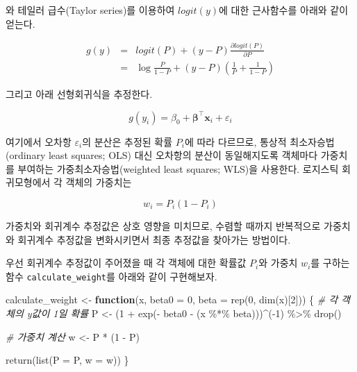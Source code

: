 \documentclass[
]{book}
\newenvironment{Shaded}{\begin{snugshade}}{\end{snugshade}}
\newcommand{\AttributeTok}[1]{\textcolor[rgb]{0.77,0.63,0.00}{#1}}
\newcommand{\CommentTok}[1]{\textcolor[rgb]{0.56,0.35,0.01}{\textit{#1}}}
\newcommand{\ControlFlowTok}[1]{\textcolor[rgb]{0.13,0.29,0.53}{\textbf{#1}}}
\newcommand{\DecValTok}[1]{\textcolor[rgb]{0.00,0.00,0.81}{#1}}
\newcommand{\FunctionTok}[1]{\textcolor[rgb]{0.00,0.00,0.00}{#1}}
\newcommand{\NormalTok}[1]{#1}
\newcommand{\OtherTok}[1]{\textcolor[rgb]{0.56,0.35,0.01}{#1}}
\newcommand{\SpecialCharTok}[1]{\textcolor[rgb]{0.00,0.00,0.00}{#1}}
\begin{document}
와 테일러 급수(Taylor series)를 이용하여 \(logit(y)\)에 대한 근사함수를 아래와 같이 얻는다.

\begin{eqnarray*}
g(y) &=& logit(P) + (y - P) \frac{\partial logit(P)}{\partial P}\\
&=& \log \frac{P}{1 - P} + (y - P) \left( \frac{1}{P} + \frac{1}{1 - P} \right)
\end{eqnarray*}

그리고 아래 선형회귀식을 추정한다.

\begin{equation*}
g(y_i) = \beta_0 + \boldsymbol\beta^\top \mathbf{x}_i + \varepsilon_i
\end{equation*}

여기에서 오차항 \(\varepsilon_i\)의 분산은 추정된 확률 \(P_i\)에 따라 다르므로, 통상적 최소자승법(ordinary least squares; OLS) 대신 오차항의 분산이 동일해지도록 객체마다 가중치를 부여하는 가중최소자승법(weighted least squares; WLS)을 사용한다. 로지스틱 회귀모형에서 각 객체의 가중치는

\begin{equation*}
w_i = P_i (1 - P_i)
\end{equation*}

가중치와 회귀계수 추정값은 상호 영향을 미치므로, 수렴할 때까지 반복적으로 가중치와 회귀계수 추정값을 변화시키면서 최종 추정값을 찾아가는 방법이다.

우선 회귀계수 추정값이 주어졌을 때 각 객체에 대한 확률값 \(P_i\)와 가중치 \(w_i\)를 구하는 함수 \texttt{calculate\_weight}를 아래와 같이 구현해보자.

\begin{Shaded}
\begin{Highlighting}[]
\NormalTok{calculate\_weight }\OtherTok{\textless{}{-}} \ControlFlowTok{function}\NormalTok{(x, }\AttributeTok{beta0 =} \DecValTok{0}\NormalTok{, }
                             \AttributeTok{beta =} \FunctionTok{rep}\NormalTok{(}\DecValTok{0}\NormalTok{, }\FunctionTok{dim}\NormalTok{(x)[}\DecValTok{2}\NormalTok{])) \{}
  \CommentTok{\# 각 객체의 y값이 1일 확률}
\NormalTok{  P }\OtherTok{\textless{}{-}}\NormalTok{ (}\DecValTok{1} \SpecialCharTok{+} \FunctionTok{exp}\NormalTok{(}\SpecialCharTok{{-}}\NormalTok{ beta0 }\SpecialCharTok{{-}}\NormalTok{ (x }\SpecialCharTok{\%*\%}\NormalTok{ beta)))}\SpecialCharTok{\^{}}\NormalTok{(}\SpecialCharTok{{-}}\DecValTok{1}\NormalTok{) }\SpecialCharTok{\%\textgreater{}\%} \FunctionTok{drop}\NormalTok{()}

  \CommentTok{\# 가중치 계산}
\NormalTok{  w }\OtherTok{\textless{}{-}}\NormalTok{ P }\SpecialCharTok{*}\NormalTok{ (}\DecValTok{1} \SpecialCharTok{{-}}\NormalTok{ P)}

  \FunctionTok{return}\NormalTok{(}\FunctionTok{list}\NormalTok{(}\AttributeTok{P =}\NormalTok{ P, }\AttributeTok{w =}\NormalTok{ w))}
\NormalTok{\}}
\end{Highlighting}
\end{Shaded}
\end{document}
